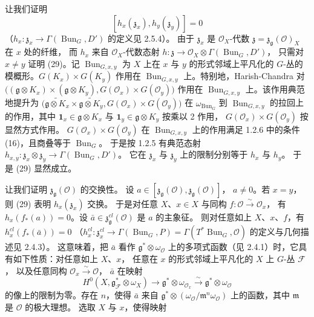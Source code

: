  让我们证明
\begin{equation}\tag{29}
  [h_x(\mathfrak{z}_x),h_y(\mathfrak{z}_y)]=0
\end{equation}
（$h_x:\mathfrak{z}_x\to\Gamma(\operatorname{Bun}_G,D')$ 的定义见 2.5.4）。
由于 $\mathfrak{z}_x$ 是 $\mathcal{O}_X$-代数
$\mathfrak{z}=\mathfrak{z}_{\mathfrak{g}}(\mathcal{O})_X$ 在 $x$ 处的纤维，
而 $h_x$ 来自 $\mathcal{O}_X$-代数态射
$h:\mathfrak{z}\to\mathcal{O}_X\otimes\Gamma(\operatorname{Bun}_G,D')$，
只需对 $x\neq y$ 证明 (29)。记 $\operatorname{Bun}_{G,x,y}$ 为 $X$ 上在 $x$ 与 $y$
的形式邻域上平凡化的 $G$-丛的模概形。$G(K_x)\times G(K_y)$ 作用在
$\operatorname{Bun}_{G,x,y}$ 上。特别地，Harish-Chandra 对
$\big((\mathfrak{g}\otimes K_x)\times(\mathfrak{g}\otimes K_y),
G(\mathcal{O}_x)\times G(\mathcal{O}_y)\big)$ 作用在
$\operatorname{Bun}_{G,x,y}$ 上。该作用典范地提升为
$\big(\widetilde{\mathfrak{g}\otimes K_x}\times\widetilde{\mathfrak{g}\otimes K_y},
G(\mathcal{O}_x)\times G(\mathcal{O}_y)\big)$
在 $\omega_{\operatorname{Bun}_G}$ 到 $\operatorname{Bun}_{G,x,y}$
的拉回上的作用，其中 $\mathbf{1}_x\in\mathfrak{g}\otimes K_x$ 与
$\mathbf{1}_y\in\mathfrak{g}\otimes K_y$ 按乘以 2 作用，
$G(\mathcal{O}_x)\times G(\mathcal{O}_y)$ 按显然方式作用。
$G(\mathcal{O}_x)\times G(\mathcal{O}_y)$ 在 $\operatorname{Bun}_{G,x,y}$
上的作用满足 1.2.6 中的条件 (16)，且商叠等于 $\operatorname{Bun}_G$。
于是按 1.2.5 有典范态射
$h_{x,y}:\mathfrak{z}_x\otimes\mathfrak{z}_y\to
\Gamma(\operatorname{Bun}_G,D')$。
它在 $\mathfrak{z}_x$ 与 $\mathfrak{z}_y$ 上的限制分别等于 $h_x$ 与 $h_y$。
于是 (29) 显然成立。

 让我们证明 $\mathfrak{z}_{\mathfrak{g}}(\mathcal{O})$ 的交换性。
设 $a\in[\mathfrak{z}_{\mathfrak{g}}(\mathcal{O}),\mathfrak{z}_{\mathfrak{g}}(\mathcal{O})]$，
$a\neq 0$。若 $x=y$，则 (29) 表明 $h_x(\mathfrak{z}_x)$ 交换。
于是对任意 $X$、$x\in X$ 与同构 $f:\mathcal{O}\xrightarrow{\sim}\mathcal{O}_x$，
有 $h_x(f_*(a))=0$。设
$\bar{a}\in\mathfrak{z}^{cl}_{\mathfrak{g}}(\mathcal{O})$ 是 $a$ 的主象征。
则对任意如上 $X$、$x$、$f$，有 $h_x^{cl}(f_*(\bar{a}))=0$
（$h_x^{cl}:\mathfrak{z}^{cl}_x\to\Gamma(\operatorname{Bun}_G,P)
=\Gamma(T^*\operatorname{Bun}_G,\mathcal{O})$ 的定义与几何描述见 2.4.3）。
这意味着，把 $\bar{a}$ 看作 $\mathfrak{g}^*\otimes\omega_{\mathcal{O}}$
上的多项式函数（见 2.4.1）时，它具有如下性质：对任意如上 $X$、$x$，
任意在 $x$ 的形式邻域上平凡化的 $X$ 上 $G$-丛 $\mathcal{F}$，
以及任意同构 $\mathcal{O}_x\xrightarrow{\sim}\mathcal{O}$，
$\bar{a}$ 在映射
\[
  H^0(X,\mathfrak{g}^*_{\mathcal{F}}\otimes\omega_X)\longrightarrow
  \mathfrak{g}^*\otimes\omega_{\mathcal{O}_x}\xrightarrow{\sim}
  \mathfrak{g}^*\otimes\omega_{\mathcal{O}}
\]
的像上的限制为零。存在 $n$，使得 $\bar{a}$ 来自
$\mathfrak{g}^*\otimes(\omega_{\mathcal{O}}/\mathfrak{m}^n\omega_{\mathcal{O}})$
上的函数，其中 $\mathfrak{m}$ 是 $\mathcal{O}$ 的极大理想。
选取 $X$ 与 $x$，使得映射

